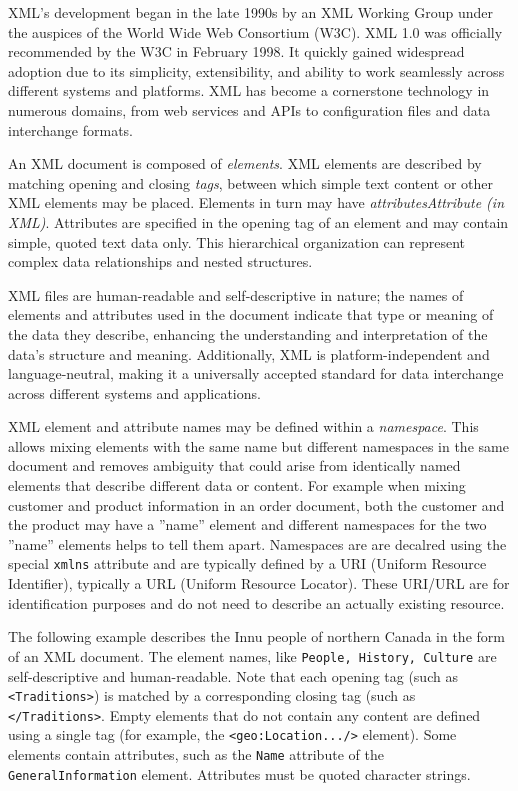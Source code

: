 XML's development began in the late 1990s by an XML Working Group under the auspices of the World Wide Web Consortium (W3C). XML 1.0 was officially recommended by the W3C in February 1998. It quickly gained widespread adoption due to its simplicity, extensibility, and ability to work seamlessly across different systems and platforms. XML has become a cornerstone technology in numerous domains, from web services and APIs to configuration files and data interchange formats.

An XML document is composed of \emph{elements}. XML elements are described by matching opening and closing \emph{tags}, between which simple text content or other XML elements may be placed. Elements in turn may have \emph{attributes}\emph{Attribute (in XML)}. Attributes are specified in the opening tag of an element and may contain simple, quoted text data only. This hierarchical organization can represent complex data relationships and nested structures. 

XML files are human-readable and self-descriptive in nature; the names of elements and attributes used in the document indicate that type or meaning of the data they describe, enhancing the understanding and interpretation of the data's structure and meaning. Additionally, XML is platform-independent and language-neutral, making it a universally accepted standard for data interchange across different systems and applications. 

XML element and attribute names may be defined within a \emph{namespace}. This allows mixing elements with the same name but different namespaces in the same document and removes ambiguity that could arise from identically named elements that describe different data or content. For example when mixing customer and product information in an order document, both the customer and the product may have a ''name'' element and different namespaces for the two ''name'' elements helps to tell them apart. Namespaces are are decalred using the special \texttt{xmlns} attribute and are typically defined by a URI (Uniform Resource Identifier), typically a URL (Uniform Resource Locator). These URI/URL are for identification purposes and do not need to describe an actually existing resource.

The following example describes the Innu people of northern Canada in the form of an XML document. The element names, like \texttt{People, History, Culture} are self-descriptive and human-readable. Note that each opening tag (such as \texttt{<Traditions>}) is matched by a corresponding closing tag (such as \texttt{</Traditions>}. Empty elements that do not contain any content are defined using a single tag (for example, the \texttt{<geo:Location.../>} element). Some elements contain attributes, such as the \texttt{Name} attribute of the \texttt{GeneralInformation} element. Attributes must be quoted character strings.

